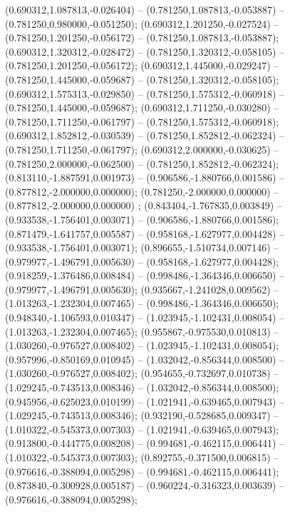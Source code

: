  (0.690312,1.087813,-0.026404) -- (0.781250,1.087813,-0.053887) -- (0.781250,0.980000,-0.051250);
 (0.690312,1.201250,-0.027524) -- (0.781250,1.201250,-0.056172) -- (0.781250,1.087813,-0.053887);
 (0.690312,1.320312,-0.028472) -- (0.781250,1.320312,-0.058105) -- (0.781250,1.201250,-0.056172);
 (0.690312,1.445000,-0.029247) -- (0.781250,1.445000,-0.059687) -- (0.781250,1.320312,-0.058105);
 (0.690312,1.575313,-0.029850) -- (0.781250,1.575312,-0.060918) -- (0.781250,1.445000,-0.059687);
 (0.690312,1.711250,-0.030280) -- (0.781250,1.711250,-0.061797) -- (0.781250,1.575312,-0.060918);
 (0.690312,1.852812,-0.030539) -- (0.781250,1.852812,-0.062324) -- (0.781250,1.711250,-0.061797);
 (0.690312,2.000000,-0.030625) -- (0.781250,2.000000,-0.062500) -- (0.781250,1.852812,-0.062324);
 (0.813110,-1.887591,0.001973) -- (0.906586,-1.880766,0.001586) -- (0.877812,-2.000000,0.000000);
 (0.781250,-2.000000,0.000000) -- (0.877812,-2.000000,0.000000) ;
 (0.843404,-1.767835,0.003849) -- (0.933538,-1.756401,0.003071) -- (0.906586,-1.880766,0.001586);
 (0.871479,-1.641757,0.005587) -- (0.958168,-1.627977,0.004428) -- (0.933538,-1.756401,0.003071);
 (0.896655,-1.510734,0.007146) -- (0.979977,-1.496791,0.005630) -- (0.958168,-1.627977,0.004428);
 (0.918259,-1.376486,0.008484) -- (0.998486,-1.364346,0.006650) -- (0.979977,-1.496791,0.005630);
 (0.935667,-1.241028,0.009562) -- (1.013263,-1.232304,0.007465) -- (0.998486,-1.364346,0.006650);
 (0.948340,-1.106593,0.010347) -- (1.023945,-1.102431,0.008054) -- (1.013263,-1.232304,0.007465);
 (0.955867,-0.975530,0.010813) -- (1.030260,-0.976527,0.008402) -- (1.023945,-1.102431,0.008054);
 (0.957996,-0.850169,0.010945) -- (1.032042,-0.856344,0.008500) -- (1.030260,-0.976527,0.008402);
 (0.954655,-0.732697,0.010738) -- (1.029245,-0.743513,0.008346) -- (1.032042,-0.856344,0.008500);
 (0.945956,-0.625023,0.010199) -- (1.021941,-0.639465,0.007943) -- (1.029245,-0.743513,0.008346);
 (0.932190,-0.528685,0.009347) -- (1.010322,-0.545373,0.007303) -- (1.021941,-0.639465,0.007943);
 (0.913800,-0.444775,0.008208) -- (0.994681,-0.462115,0.006441) -- (1.010322,-0.545373,0.007303);
 (0.892755,-0.371500,0.006815) -- (0.976616,-0.388094,0.005298) -- (0.994681,-0.462115,0.006441);
 (0.873840,-0.300928,0.005187) -- (0.960224,-0.316323,0.003639) -- (0.976616,-0.388094,0.005298);
